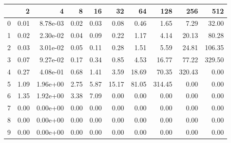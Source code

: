 \begin{tabular}{lrrrrrrrrr}
\toprule
{} &   2   &       4   &   8   &   16  &    32  &    64  &     128 &     256 &     512 \\
\midrule
0 &  0.01 &  8.78e-03 &  0.02 &  0.03 &   0.08 &   0.46 &    1.65 &    7.29 &   32.00 \\
1 &  0.02 &  2.30e-02 &  0.04 &  0.09 &   0.22 &   1.17 &    4.14 &   20.13 &   80.28 \\
2 &  0.03 &  3.01e-02 &  0.05 &  0.11 &   0.28 &   1.51 &    5.59 &   24.81 &  106.35 \\
3 &  0.07 &  9.27e-02 &  0.17 &  0.34 &   0.85 &   4.53 &   16.77 &   77.22 &  329.50 \\
4 &  0.27 &  4.08e-01 &  0.68 &  1.41 &   3.59 &  18.69 &   70.35 &  320.43 &    0.00 \\
5 &  1.09 &  1.96e+00 &  2.75 &  5.87 &  15.17 &  81.05 &  314.45 &    0.00 &    0.00 \\
6 &  1.35 &  1.92e+00 &  3.38 &  7.09 &   0.00 &   0.00 &    0.00 &    0.00 &    0.00 \\
7 &  0.00 &  0.00e+00 &  0.00 &  0.00 &   0.00 &   0.00 &    0.00 &    0.00 &    0.00 \\
8 &  0.00 &  0.00e+00 &  0.00 &  0.00 &   0.00 &   0.00 &    0.00 &    0.00 &    0.00 \\
9 &  0.00 &  0.00e+00 &  0.00 &  0.00 &   0.00 &   0.00 &    0.00 &    0.00 &    0.00 \\
\bottomrule
\end{tabular}
